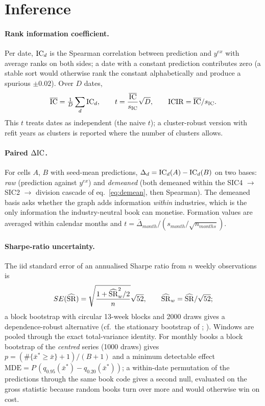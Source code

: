 \section{Inference}\label{sec:infer}

\paragraph{Rank information coefficient.}
Per date, $\mathrm{IC}_d$ is the Spearman correlation between prediction and $y^{ex}$ with average ranks on both sides; a date with a constant prediction contributes zero (a stable sort would otherwise rank the constant alphabetically and produce a spurious $\pm0.02$). Over $D$ dates,
\begin{equation}\label{eq:ic}
\overline{\mathrm{IC}}=\tfrac1D\sum_d \mathrm{IC}_d,\qquad t=\frac{\overline{\mathrm{IC}}}{s_{\mathrm{IC}}}\sqrt D,\qquad \mathrm{ICIR}=\overline{\mathrm{IC}}/s_{\mathrm{IC}}.
\end{equation}
This $t$ treats dates as independent (the naive $t$); a cluster-robust version with refit years as clusters is reported where the number of clusters allows.

\paragraph{Paired $\Delta\mathrm{IC}$.}
For cells $A$, $B$ with seed-mean predictions, $\Delta_d=\mathrm{IC}_d(A)-\mathrm{IC}_d(B)$ on two bases: \emph{raw} (prediction against $y^{ex}$) and \emph{demeaned} (both demeaned within the SIC4 $\to$ SIC2 $\to$ division cascade of eq.~\eqref{eq:demean}, then Spearman). The demeaned basis asks whether the graph adds information \emph{within} industries, which is the only information the industry-neutral book can monetise. Formation values are averaged within calendar months and $t=\bar\Delta_{month}/(s_{month}/\sqrt{n_{months}})$.

\paragraph{Sharpe-ratio uncertainty.}
The iid standard error of an annualised Sharpe ratio from $n$ weekly observations \citep{lo2002} is
\begin{equation}\label{eq:se}
SE(\widehat{\mathrm{SR}})=\sqrt{\frac{1+\widehat{\mathrm{SR}}_w^2/2}{n}}\sqrt{52},\qquad \widehat{\mathrm{SR}}_w=\widehat{\mathrm{SR}}/\sqrt{52};
\end{equation}
a block bootstrap with circular 13-week blocks and 2000 draws gives a dependence-robust alternative (cf.\ the stationary bootstrap of \citealt{politisromano1994}; \citealt{ledoitwolf2008}). Windows are pooled through the exact total-variance identity. For monthly books a block bootstrap of the \emph{centred} series (1000 draws) gives $p=(\#\{\bar x^*\ge\bar x\}+1)/(B+1)$ and a minimum detectable effect $\mathrm{MDE}=P\,(q_{0.95}(\bar x^*)-q_{0.20}(\bar x^*))$; a within-date permutation of the predictions through the same book code gives a second null, evaluated on the gross statistic because random books turn over more and would otherwise win on cost.

